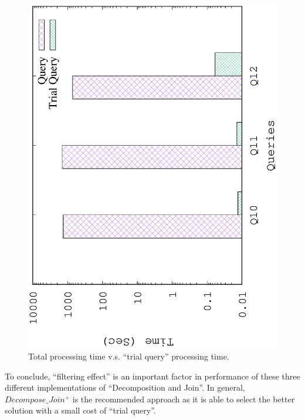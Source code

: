 \begin{figure}[H]
	\centering
	\includegraphics[scale=0.5, angle=270]{plot/threesample}
	\caption{Total processing time v.s. ``trial query'' processing time.}
	\label{fig:threesample}
\end{figure}

To conclude, ``filtering effect'' is an important factor in performance of these three different implementations of ``Decomposition and Join''. In general, $Decompose\_Join^{+}$ is the recommended approach as it is able to select the better solution with a small cost of ``trial query''.


%

